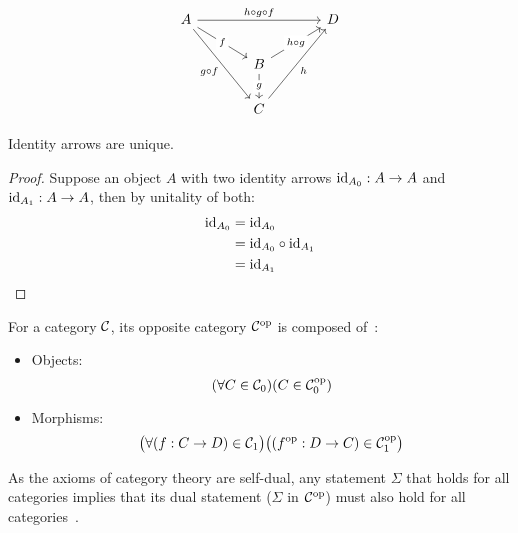\begin{example}
  \[\begin{tikzcd}[ampersand replacement=\&,column sep=scriptsize]
    A \&\&\&\& D \\
    \&\& B \\
    \&\& C
    \arrow["f"{description}, from=1-1, to=2-3]
    \arrow["g"{description}, from=2-3, to=3-3]
    \arrow["h"', from=3-3, to=1-5]
    \arrow["{g\circ f}"', from=1-1, to=3-3]
    \arrow["{h\circ g}"{description}, from=2-3, to=1-5]
    \arrow["{h\circ g\circ f}", from=1-1, to=1-5]
  \end{tikzcd}\]
  \vspace{-\baselineskip}
\end{example}

\begin{theorem}
  Identity arrows are unique.

  \begin{proof}
    Suppose an object $A$ with two identity arrows $\mathrm{id}_{A_0}: A\to A$ and
    $\mathrm{id}_{A_1}:A\to A$, then by unitality of both:
    \[
      \begin{aligned}
        \mathrm{id}_{A_0} &= \mathrm{id}_{A_0}\\
        &= \mathrm{id}_{A_0} \circ \mathrm{id}_{A_1}\\
        &= \mathrm{id}_{A_1}
      \end{aligned}
    \]
  \end{proof}
\end{theorem}

\begin{definition}

  For a category $\mathcal{C}$, its opposite category $\mathcal{C}^{\mathrm{op}}$ is composed
  of~\parencite[p.~15]{awodey:category_theory}:

  \begin{itemize}
    \item Objects:
      \[(\forall C \in \mathcal{C}_0)
        (C\in \mathcal{C}^{\mathrm{op}}_0)\]
    \item Morphisms:
      \[\big(\forall (f: C\to D) \in \mathcal{C}_1\big)
        \big((f^{\mathrm{op}} : D\to C)\in \mathcal{C}^{\mathrm{op}}_1\big)\]
  \end{itemize}
\end{definition}

\begin{remark}
  As the axioms of category theory are self-dual, any statement $\Sigma$ that
  holds for all categories implies that its dual statement ($\Sigma$ in
  $\mathcal{C}^{\mathrm{op}}$) must also hold for all
  categories~\parencite[p.~16]{leinster:basic_category_theory}.
\end{remark}





